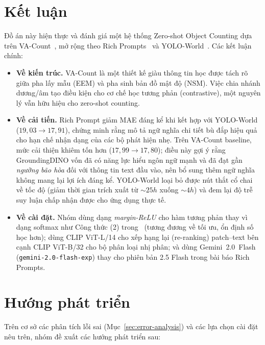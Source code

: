 \documentclass[a4paper,12pt]{report}
\numberwithin{figure}{chapter}
\numberwithin{table}{chapter}
\begin{document}
\section{Kết luận}
Đồ án này hiện thực và đánh giá một hệ thống Zero-shot Object Counting dựa trên VA-Count~\cite{vacount}, mở rộng theo Rich Prompts~\cite{richprompts} và YOLO-World~\cite{yoloworld}. Các kết luận chính:

\begin{itemize}
    \item \textbf{Về kiến trúc.} VA-Count là một thiết kế giàu thông tin học được tách rõ giữa pha lấy mẫu (EEM) và pha sinh bản đồ mật độ (NSM). Việc chia nhánh dương/âm tạo điều kiện cho cơ chế học tương phản (contrastive), một nguyên lý vẫn hữu hiệu cho zero-shot counting.
    \item \textbf{Về cải tiến.} Rich Prompt giảm MAE đáng kể khi kết hợp với YOLO-World ($19{,}03 \to 17{,}91$), chứng minh rằng mô tả ngữ nghĩa chi tiết bù đắp hiệu quả cho hạn chế nhận dạng của các bộ phát hiện nhẹ. Trên VA-Count baseline, mức cải thiện khiêm tốn hơn ($17{,}99 \to 17{,}80$); điều này gợi ý rằng GroundingDINO vốn đã có năng lực hiểu ngôn ngữ mạnh và đã đạt gần \emph{ngưỡng bão hòa} đối với thông tin text đầu vào, nên bổ sung thêm ngữ nghĩa không mang lại lợi ích đáng kể. YOLO-World loại bỏ được nút thắt cổ chai về tốc độ (giảm thời gian trích xuất từ $\sim 25h$ xuống $\sim 4h$) và đem lại độ trễ suy luận chấp nhận được cho ứng dụng thực tế.
    \item \textbf{Về cài đặt.} Nhóm dùng dạng \emph{margin-ReLU} cho hàm tương phản thay vì dạng softmax như Công thức (2) trong~\cite{vacount} (tương đương về tối ưu, ổn định số học hơn); dùng CLIP ViT-L/14 cho xếp hạng lại (re-ranking) patch--text bên cạnh CLIP ViT-B/32 cho bộ phân loại nhị phân; và dùng Gemini~2.0~Flash (\texttt{gemini-2.0-flash-exp}) thay cho phiên bản 2.5 Flash trong bài báo Rich Prompts.
\end{itemize}

\section{Hướng phát triển}

Trên cơ sở các phân tích lỗi sai (Mục~\ref{sec:error-analysis}) và các lựa chọn cài đặt nêu trên, nhóm đề xuất các hướng phát triển sau:
\end{document}
